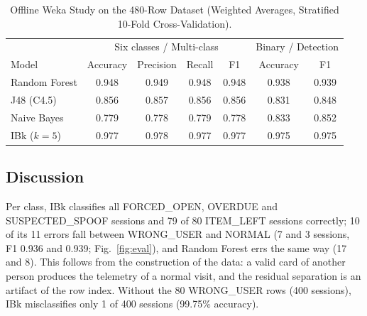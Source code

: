 \documentclass[journal,onecolumn]{IEEEtran}
\begin{document}
\begin{table}[!htbp]
\renewcommand{\arraystretch}{1.04}
\centering
\small
\caption{Offline Weka Study on the 480-Row Dataset (Weighted Averages, Stratified 10-Fold Cross-Validation).}
\label{tab:ml}
\vspace{4pt}
\begin{tabular}{l c c c c c c}
\hline
 & \multicolumn{4}{c}{Six classes / Multi-class} & \multicolumn{2}{c}{Binary / Detection} \\
Model & Accuracy & Precision & Recall & F1 & Accuracy & F1 \\
\hline
\rule{0pt}{2.6ex}Random Forest & 0.948 & 0.949 & 0.948 & 0.948 & 0.938 & 0.939 \\
J48 (C4.5)    & 0.856 & 0.857 & 0.856 & 0.856 & 0.831 & 0.848 \\
Naive Bayes   & 0.779 & 0.778 & 0.779 & 0.778 & 0.833 & 0.852 \\
IBk ($k=5$)   & 0.977 & 0.978 & 0.977 & 0.977 & 0.975 & 0.975 \\
\hline
\end{tabular}
\end{table}

\subsection{Discussion}

Per class, IBk classifies all FORCED\_OPEN, OVERDUE and SUSPECTED\_SPOOF sessions and 79 of 80 ITEM\_LEFT sessions
correctly; 10 of its 11 errors fall between WRONG\_USER and NORMAL (7 and 3 sessions, F1 0.936 and 0.939;
Fig.~\ref{fig:eval}), and Random Forest errs the same way (17 and 8). This follows from the construction of the data: a valid card of
another person produces the telemetry of a normal visit, and the residual separation is an artifact of the row index.
Without the 80 WRONG\_USER rows (400 sessions), IBk misclassifies only 1 of 400 sessions (99.75\% accuracy).
\end{document}
